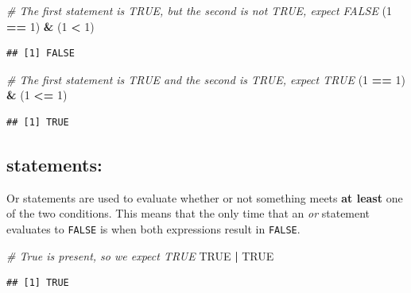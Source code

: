\documentclass[
]{book}
\newenvironment{Shaded}{\begin{snugshade}}{\end{snugshade}}
\newcommand{\CommentTok}[1]{\textcolor[rgb]{0.56,0.35,0.01}{\textit{#1}}}
\newcommand{\DecValTok}[1]{\textcolor[rgb]{0.00,0.00,0.81}{#1}}
\newcommand{\NormalTok}[1]{#1}
\newcommand{\OperatorTok}[1]{\textcolor[rgb]{0.81,0.36,0.00}{\textbf{#1}}}
\newcommand{\OtherTok}[1]{\textcolor[rgb]{0.56,0.35,0.01}{#1}}
\newcommand{\StringTok}[1]{\textcolor[rgb]{0.31,0.60,0.02}{#1}}
\begin{document}
\begin{Shaded}
\begin{Highlighting}[]
\CommentTok{\# The first statement is TRUE, but the second is not TRUE, expect FALSE}
\NormalTok{(}\DecValTok{1} \OperatorTok{==}\StringTok{ }\DecValTok{1}\NormalTok{) }\OperatorTok{\&}\StringTok{ }\NormalTok{(}\DecValTok{1} \OperatorTok{\textless{}}\StringTok{ }\DecValTok{1}\NormalTok{)}
\end{Highlighting}
\end{Shaded}

\begin{verbatim}
## [1] FALSE
\end{verbatim}

\begin{Shaded}
\begin{Highlighting}[]
\CommentTok{\# The first statement is TRUE and the second is TRUE, expect TRUE}
\NormalTok{(}\DecValTok{1} \OperatorTok{==}\StringTok{ }\DecValTok{1}\NormalTok{) }\OperatorTok{\&}\StringTok{ }\NormalTok{(}\DecValTok{1} \OperatorTok{\textless{}=}\StringTok{ }\DecValTok{1}\NormalTok{)}
\end{Highlighting}
\end{Shaded}

\begin{verbatim}
## [1] TRUE
\end{verbatim}

\hypertarget{statements-1}{%
\subsection{\texorpdfstring{\texttt{\textbar{}} statements:}{\textbar{} statements:}}\label{statements-1}}

Or statements are used to evaluate whether or not something meets \textbf{at least} one of the two conditions. This means that the only time that an \emph{or} statement evaluates to \texttt{FALSE} is when both expressions result in \texttt{FALSE}.

\begin{Shaded}
\begin{Highlighting}[]
\CommentTok{\# True is present, so we expect TRUE}
\OtherTok{TRUE} \OperatorTok{|}\StringTok{ }\OtherTok{TRUE}
\end{Highlighting}
\end{Shaded}

\begin{verbatim}
## [1] TRUE
\end{verbatim}
\end{document}
